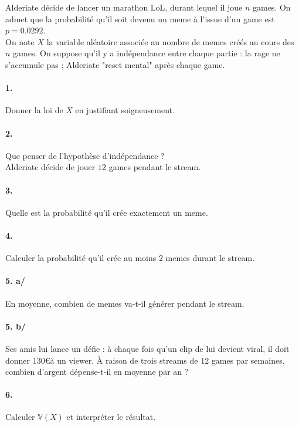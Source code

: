 		Alderiate décide de lancer un marathon LoL, durant lequel il joue $n$ games. On admet que la probabilité qu'il soit devenu un meme à l'issue d'un game est $p=0.0292$.\\ 
		
		On note $X$ la variable aléatoire associée au nombre de memes créés au cours des $n$ games. On suppose qu'il y a indépendance entre chaque partie : la rage ne s'accumule pas ; Alderiate "reset mental" après chaque game.
		
		\paragraph{1.} Donner la loi de $X$ en justifiant soigneusement.
		
		\paragraph{2.} Que penser de l'hypothèse d'indépendance ?\\
		
		Alderiate décide de jouer $12$ games pendant le stream.
		
		\paragraph{3.} Quelle est la probabilité qu'il crée exactement un meme.
		
		\paragraph{4.} Calculer la probabilité qu'il crée au moins $2$ memes durant le stream.
		
		\paragraph{5. a/} En moyenne, combien de memes va-t-il générer pendant le stream.   
		
		\paragraph{5. b/} Ses amis lui lance un défie : à chaque fois qu'un clip de lui devient viral, il doit donner $130$\euro à un viewer. À raison de trois streams de $12$ games par semaines, combien d'argent dépense-t-il en moyenne par an ?
		
		\paragraph{6.} Calculer $\mathbb{V}(X)$ et interpréter le résultat.
		

